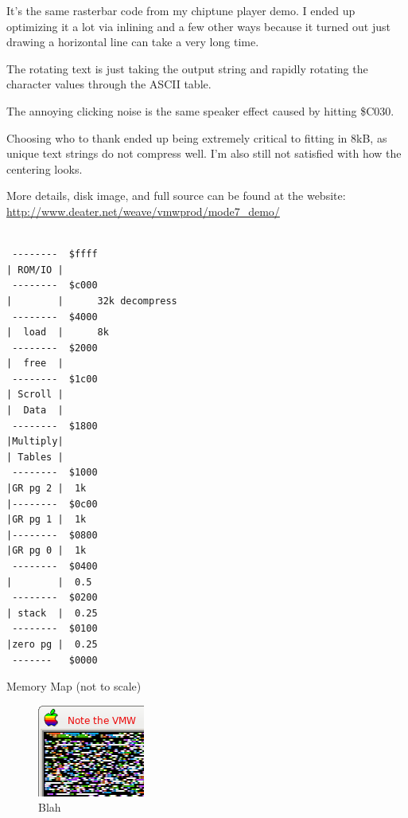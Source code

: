 \documentclass[twocolumn]{article}
\begin{document}
  It's the same rasterbar code from my chiptune player demo.  I ended up
  optimizing it a lot via inlining and a few other ways because it turned
  out just drawing a horizontal line can take a very long time.

  The rotating text is just taking the output string and rapidly rotating the
  character values through the ASCII table.

  The annoying clicking noise is the same speaker effect caused by hitting
  \$C030.

  Choosing who to thank ended up being extremely critical to fitting in 8kB,
  as unique text strings do not compress well.  I'm also still not satisfied
  with how the centering looks.


More details, disk image, and full source can be found at the website:
\url{http://www.deater.net/weave/vmwprod/mode7_demo/}

\begin{table}
\begin{verbatim}

 --------  $ffff
| ROM/IO |
 --------  $c000
|        |      32k decompress
 --------  $4000
|  load  |      8k
 --------  $2000
|  free  |
 --------  $1c00
| Scroll |
|  Data  |
 --------  $1800
|Multiply|
| Tables |	
 --------  $1000
|GR pg 2 |	1k
|--------  $0c00
|GR pg 1 |	1k
|--------  $0800
|GR pg 0 |	1k
 --------  $0400
|        |	0.5
 --------  $0200
| stack  |	0.25
 --------  $0100
|zero pg |	0.25
 -------   $0000

\end{verbatim}
\caption{Memory Map (not to scale)}
\end{table}

\begin{figure}
\includegraphics[width=\columnwidth]{figures/hidden_vmw.png}
\caption{Blah}
\end{figure}
\end{document}
